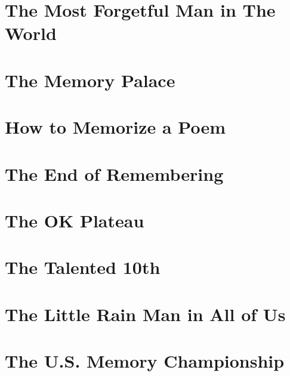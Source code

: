 \documentclass[oneside]{book}
\numberwithin{equation}{section}
\begin{document}
\section{The Most Forgetful Man in The World}


\section{The Memory Palace}


\section{How to Memorize a Poem}


\section{The End of Remembering}


\section{The OK Plateau}


\section{The Talented 10th}


\section{The Little Rain Man in All of Us}


\section{The U.S. Memory Championship}
\end{document}
